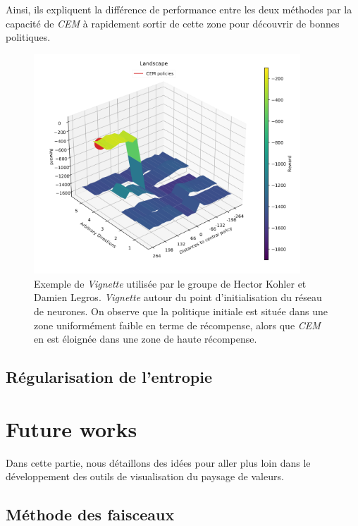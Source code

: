 \documentclass[12pt]{article}
\begin{document}
Ainsi, ils expliquent la différence de performance entre les deux méthodes par la capacité de \emph{CEM} à rapidement sortir de cette zone pour découvrir de bonnes politiques. \\

\begin{figure}[htp]
    \centering
    \includegraphics[width=10cm]{Images/cem_example}
    \caption{Exemple de \emph{Vignette} utilisée par le groupe de Hector Kohler et Damien Legros. \emph{Vignette} autour du point d'initialisation du réseau de neurones. On observe que la politique initiale est située dans une zone uniformément faible en terme de récompense, alors que \emph{CEM} en est éloignée dans une zone de haute récompense.}
    \label{fig:cemExample}
\end{figure}

\subsection{Régularisation de l'entropie}

\section{Future works}
\label{future}

Dans cette partie, nous détaillons des idées pour aller plus loin dans le développement des outils de visualisation du paysage de valeurs. \\

\subsection{Méthode des faisceaux}
\end{document}
